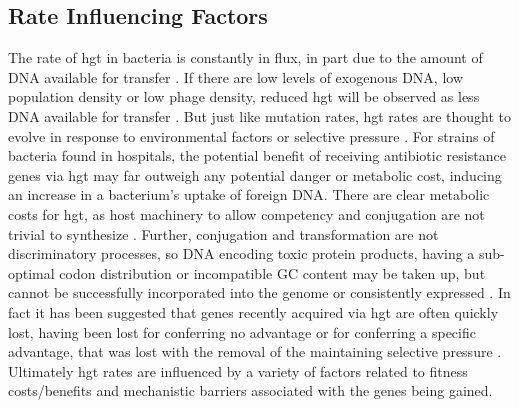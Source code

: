 \subsection{Rate Influencing Factors}
The rate of \ac{hgt} in bacteria is constantly in flux, in part due to the amount of DNA available for transfer \citep{trendbs}.
If there are low levels of exogenous DNA, low population density or low phage density, reduced \ac{hgt} will be observed as less DNA available for transfer \citep{lgt}.
But just like mutation rates, \ac{hgt} rates are thought to evolve in response to environmental factors or selective pressure \citep{mtrate,hgtrate}.
For strains of bacteria found in hospitals, the potential benefit of receiving antibiotic resistance genes via \ac{hgt} may far outweigh any potential danger or metabolic cost, inducing an increase in a bacterium's uptake of foreign DNA. \citep{hospital}
There are clear metabolic costs for \ac{hgt}, as host machinery to allow competency and conjugation are not trivial to synthesize \citep{hgtcost}.
Further, conjugation and transformation are not discriminatory processes, so DNA encoding toxic protein products, having a sub-optimal codon distribution or incompatible GC content may be taken up, but cannot be successfully incorporated into the genome or consistently expressed \citep{hgtcost}.
In fact it has been suggested that genes recently acquired via \ac{hgt} are often quickly lost, having been lost for conferring no advantage or for conferring a specific advantage, that was lost with the removal of the maintaining selective pressure \citep{fastlane}.
Ultimately \ac{hgt} rates are influenced by a variety of factors related to fitness costs/benefits and mechanistic barriers associated with the genes being gained.
